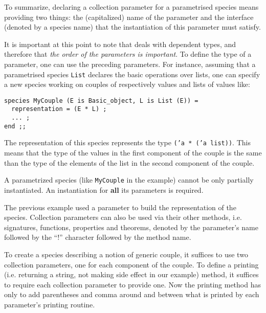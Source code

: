 To summarize, declaring a collection parameter for a parametrised
species means providing two things: the (capitalized) name of the
parameter and the interface (denoted by a species name) that the
instantiation of this parameter must satisfy.


\smallskip It is important at this point to note that {\focal} deals with
dependent types, and therefore that {\em
  the order of the parameters is important}. To define the type of a
parameter, one can use the preceding parameters. For instance,
assuming that a parametrised species {\tt List}
declares the basic operations over lists, one can specify a new
species working on couples of respectively values and lists of values
like:

{\scriptsize
\begin{lstlisting}
species MyCouple (E is Basic_object, L is List (E)) =
  representation = (E * L) ;
  ... ;
end ;;
\end{lstlisting}}

The representation of this species represents the type
{\tt ('a * ('a list))}. This means that the type of the values in the
first component of the couple is the same than the type of the
elements of the list in the second component of the couple.


A parametrized species (like {\tt MyCouple} in the example) cannot be only
partially instantiated. An instantiation for {\bf all} its parameters is
required.


\medskip
\label{method-qualification}
The previous example  used a parameter to build the representation of the
species.
Collection parameters can also be used via their other methods,
i.e. signatures, functions, properties and theorems, denoted by the
parameter's name followed by  the ``!''
character followed by the method name.

To create a species describing a notion of generic couple, it suffices
to use two collection parameters, one for each component of the
couple. To define a printing (i.e. returning a string, not making side
effect in our example) method, it suffices to require each collection
parameter to provide one. Now the printing method has only to
add parentheses and comma around and between what is printed by each
parameter's printing routine.

